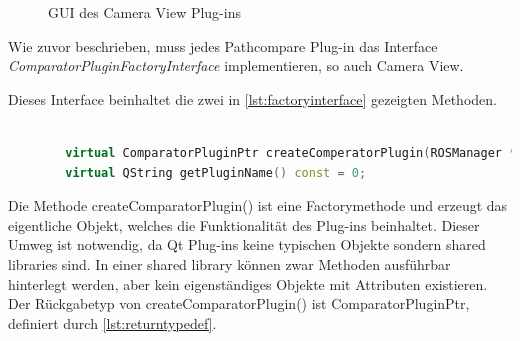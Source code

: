 \begin{figure}[t]
  \begin{center}
  \end{center}
  \caption{GUI des Camera View Plug-ins}
  \label{fig:cameraview}
\end{figure}

Wie zuvor beschrieben, muss jedes Pathcompare Plug-in das Interface
\textit{ComparatorPluginFactoryInterface} implementieren, so auch Camera View.

Dieses Interface beinhaltet die zwei in \autoref{lst:factoryinterface}
gezeigten Methoden.

\begin{lstlisting}[caption=Interfacemethoden - Plug-ins müssen diese implementieren , language=C++, basicstyle=\footnotesize, label=lst:factoryinterface]

        virtual ComparatorPluginPtr createComperatorPlugin(ROSManager * ros_manager, QWidget *tab_widget) const = 0;
        virtual QString getPluginName() const = 0;

\end{lstlisting}

Die Methode createComparatorPlugin() ist eine Factorymethode und erzeugt das
eigentliche Objekt, welches die Funktionalität des Plug-ins beinhaltet. Dieser
Umweg ist notwendig, da Qt Plug-ins keine typischen Objekte sondern
shared libraries sind. In einer shared library können
zwar Methoden ausführbar hinterlegt werden, aber kein eigenständiges Objekte
mit Attributen existieren. Der Rückgabetyp von createComparatorPlugin() ist
ComparatorPluginPtr, definiert durch \autoref{lst:returntypedef}.

